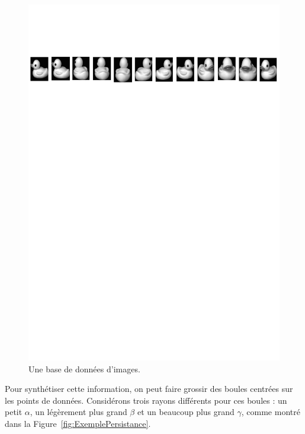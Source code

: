 \begin{figure}[h]\centering
\includegraphics[width=\textwidth]{figures/ExampleDataset}
\caption{\label{fig:donnees} Une base de donn\'ees d'images.}
\end{figure}


Pour synth\'etiser cette information, on peut faire grossir des boules centr\'ees sur les points de donn\'ees.
Consid\'erons trois rayons diff\'erents pour ces boules : un petit $\alpha$, un l\'eg\`erement plus grand $\beta$ et un
beaucoup plus grand $\gamma$, comme montr\'e dans la Figure~\ref{fig:ExemplePersistance}.

